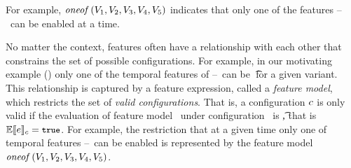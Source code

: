 For example, \ensuremath{\oneof {\vOne,\vTwo,\vThree,\vFour,\vFive}} indicates that 
only one of the features \vOne--\vFive\ can be enabled at a time.
%


No matter the context, features often have a relationship with each other that
constrains the set of possible configurations. For example, in our motivating example ()
only one of the
temporal features of \vOne--\vFive\ can be \t\ for a given variant. This
relationship is captured by a feature expression, called a \emph{feature model}, 
which restricts the set of \emph{valid configurations}.
That is, a configuration $\config$ is only valid if the evaluation of feature model \dimMeta\
under configuration \config\ is \t, that is $\fSem{\dimMeta}=\t$.
%
For example, the restriction that at a given time only one of temporal features
\vOne--\vFive\ 
can be enabled is represented by the feature model
$\oneof {\vOne, \vTwo, \vThree, \vFour, \vFive}$.

